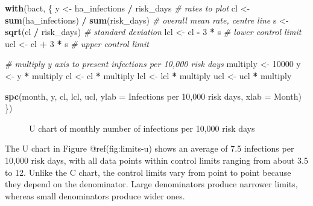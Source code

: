 \documentclass[
]{book}
\makeatletter
\newenvironment{Shaded}{\begin{snugshade}}{\end{snugshade}}
\newcommand{\AttributeTok}[1]{\textcolor[rgb]{0.13,0.29,0.53}{#1}}
\newcommand{\CommentTok}[1]{\textcolor[rgb]{0.56,0.35,0.01}{\textit{#1}}}
\newcommand{\DecValTok}[1]{\textcolor[rgb]{0.00,0.00,0.81}{#1}}
\newcommand{\FunctionTok}[1]{\textcolor[rgb]{0.13,0.29,0.53}{\textbf{#1}}}
\newcommand{\NormalTok}[1]{#1}
\newcommand{\OtherTok}[1]{\textcolor[rgb]{0.56,0.35,0.01}{#1}}
\newcommand{\SpecialCharTok}[1]{\textcolor[rgb]{0.81,0.36,0.00}{\textbf{#1}}}
\newcommand{\StringTok}[1]{\textcolor[rgb]{0.31,0.60,0.02}{#1}}
\newcommand*\pandocbounded[1]{%
  \sbox\pandoc@box{#1}%
  \Gscale@div\@tempa{\textheight}{\dimexpr\ht\pandoc@box+\dp\pandoc@box\relax}%
  \Gscale@div\@tempb{\linewidth}{\wd\pandoc@box}%
  \ifdim\@tempb\p@<\@tempa\p@\let\@tempa\@tempb\fi%
  \ifdim\@tempa\p@<\p@\scalebox{\@tempa}{\usebox\pandoc@box}%
  \else\usebox{\pandoc@box}%
  \fi%
}
\makeatother
\begin{document}
\begin{Shaded}
\begin{Highlighting}[]
\FunctionTok{with}\NormalTok{(bact, \{}
\NormalTok{  y   }\OtherTok{\textless{}{-}}\NormalTok{ ha\_infections }\SpecialCharTok{/}\NormalTok{ risk\_days           }\CommentTok{\# rates to plot}
\NormalTok{  cl  }\OtherTok{\textless{}{-}} \FunctionTok{sum}\NormalTok{(ha\_infections) }\SpecialCharTok{/} \FunctionTok{sum}\NormalTok{(risk\_days) }\CommentTok{\# overall mean rate, centre line}
\NormalTok{  s   }\OtherTok{\textless{}{-}} \FunctionTok{sqrt}\NormalTok{(cl }\SpecialCharTok{/}\NormalTok{ risk\_days)                }\CommentTok{\# standard deviation}
\NormalTok{  lcl }\OtherTok{\textless{}{-}}\NormalTok{ cl }\SpecialCharTok{{-}} \DecValTok{3} \SpecialCharTok{*}\NormalTok{ s                          }\CommentTok{\# lower control limit}
\NormalTok{  ucl }\OtherTok{\textless{}{-}}\NormalTok{ cl }\SpecialCharTok{+} \DecValTok{3} \SpecialCharTok{*}\NormalTok{ s                          }\CommentTok{\# upper control limit}
  
  \CommentTok{\# multiply y axis to present infections per 10,000 risk days}
\NormalTok{  multiply }\OtherTok{\textless{}{-}} \DecValTok{10000}
\NormalTok{  y        }\OtherTok{\textless{}{-}}\NormalTok{ y }\SpecialCharTok{*}\NormalTok{ multiply}
\NormalTok{  cl       }\OtherTok{\textless{}{-}}\NormalTok{ cl }\SpecialCharTok{*}\NormalTok{ multiply}
\NormalTok{  lcl      }\OtherTok{\textless{}{-}}\NormalTok{ lcl }\SpecialCharTok{*}\NormalTok{ multiply}
\NormalTok{  ucl      }\OtherTok{\textless{}{-}}\NormalTok{ ucl }\SpecialCharTok{*}\NormalTok{ multiply}
  
  \FunctionTok{spc}\NormalTok{(month, y, cl, lcl, ucl, }
      \AttributeTok{ylab =} \StringTok{\textquotesingle{}Infections per 10,000 risk days\textquotesingle{}}\NormalTok{,}
      \AttributeTok{xlab =} \StringTok{\textquotesingle{}Month\textquotesingle{}}\NormalTok{)}
\NormalTok{\})}
\end{Highlighting}
\end{Shaded}

\begin{figure}
\centering
\pandocbounded{}
\caption{U chart of monthly number of infections per 10,000 risk days}
\end{figure}

The U chart in Figure @ref(fig:limits-u) shows an average of 7.5
infections per 10,000 risk days, with all data points within control
limits ranging from about 3.5 to 12. Unlike the C chart, the control
limits vary from point to point because they depend on the denominator.
Large denominators produce narrower limits, whereas small denominators
produce wider ones.
\end{document}
